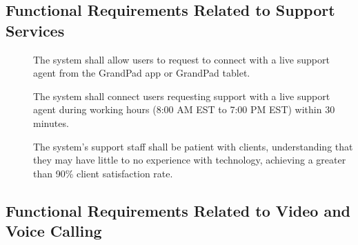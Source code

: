 \subsection*{Functional Requirements Related to Support Services}

\begin{description}
    \item[\textbf{\showfunchelpcounter}]
        The system shall allow users to request to connect with a live support
            agent from the GrandPad app or GrandPad tablet.
    \item[\textbf{\showfunchelpcounter}]
        The system shall connect users requesting support with a live support
            agent during working hours (8:00 AM EST to 7:00 PM EST) within 30
            minutes.
    \item[\textbf{\showfunchelpcounter}]
        The system's support staff shall be patient with clients, understanding
            that they may have little to no experience with technology,
            achieving a greater than 90\% client satisfaction rate.
\end{description}

\subsection*{Functional Requirements Related to Video and Voice Calling}


